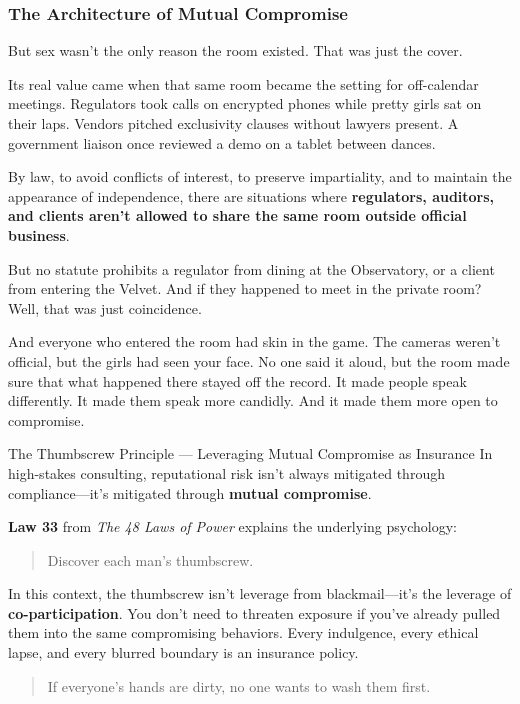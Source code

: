 \medskip

\subsubsection{The Architecture of Mutual Compromise}


But sex wasn’t the only reason the room existed. That was just the cover.

Its real value came when that same room became the setting for off-calendar meetings. Regulators took calls on encrypted 
phones while pretty girls sat on their laps. Vendors pitched exclusivity clauses without lawyers present. A government 
liaison once reviewed a demo on a tablet between dances.

By law, to avoid conflicts of interest, to preserve impartiality, and to maintain the appearance of independence,
there are situations where \textbf{regulators, auditors, and clients aren’t allowed to share the same room outside
official business}.

But no statute prohibits a regulator from dining at the Observatory, or a client from entering the Velvet. And if they 
happened to meet in the private room? Well, that was just coincidence.

And everyone who entered the room had skin in the game. The cameras weren’t official, but the girls had seen your face. No 
one said it aloud, but the room made sure that what happened there stayed off the record. It made people speak differently. 
It made them speak more candidly. And it made them more open to compromise.

\medskip

\begin{PhilosophicalSidebar}{The Thumbscrew Principle --- Leveraging Mutual Compromise as Insurance}
In high-stakes consulting, reputational risk isn’t always mitigated through compliance—it’s mitigated through 
\textbf{mutual compromise}.  

\medskip

\textbf{Law 33} from \textit{The 48 Laws of Power} explains the underlying psychology:  

\begin{quote}
Discover each man’s thumbscrew.
\end{quote}

In this context, the thumbscrew isn’t leverage from blackmail—it’s the leverage of \textbf{co-participation}. 
You don’t need to threaten exposure if you’ve already pulled them into the same compromising behaviors. Every 
indulgence, every ethical lapse, and every blurred boundary is an insurance policy.  

\begin{quote}
If everyone’s hands are dirty, no one wants to wash them first.
\end{quote}
\end{PhilosophicalSidebar}

